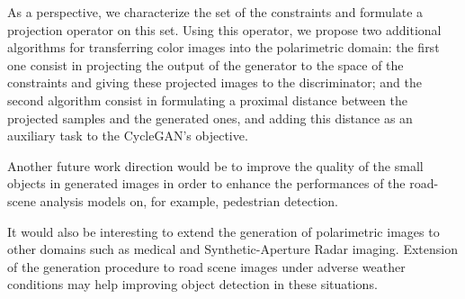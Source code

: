 As a perspective, we characterize the set of the constraints and formulate a projection operator on this set. Using this operator, we propose two additional algorithms for transferring color images into the polarimetric domain: the first one consist in projecting the output of the generator to the space of the constraints and giving these projected images to the discriminator; and the second algorithm consist in formulating a proximal distance between the projected samples and the generated ones, and adding this distance as an auxiliary task to the CycleGAN's objective.

Another future work  direction would  be to improve the quality of the small objects in generated images in order to enhance the performances of the road-scene analysis models on, for example, pedestrian detection.

It would also be interesting to extend the generation of polarimetric images to other domains such as medical and Synthetic-Aperture Radar \citep{vanZyl2011} imaging. Extension of the generation procedure to road scene images under adverse weather conditions may help improving object detection in these situations.